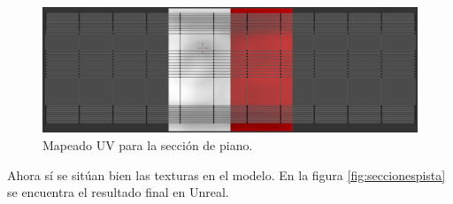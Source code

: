\begin{figure}[H]
    \centering
    \includegraphics[width=\textwidth]{imagenes/converted/pista/uv-kerb.jpg}
    \caption{Mapeado UV para la sección de piano.}
    \label{fig:uvkerb}
\end{figure}

Ahora sí se sitúan bien las texturas en el modelo. En la figura \ref{fig:seccionespista} se encuentra el resultado final en Unreal.

